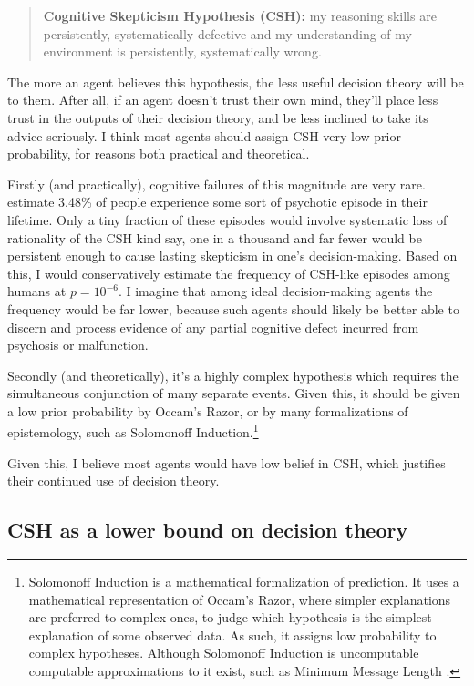\documentclass{article}
\begin{document}
\begin{quote}
\textbf{Cognitive Skepticism Hypothesis (CSH):} my reasoning skills are persistently, systematically defective and my understanding of my environment is persistently, systematically wrong.
\end{quote}

\noindent
The more an agent believes this hypothesis, the less useful decision theory will be to them. After all, if an agent doesn't trust their own mind, they'll place less trust in the outputs of their decision theory, and be less inclined to take its advice seriously. I think most agents should assign CSH very low prior probability, for reasons both practical and theoretical.

Firstly (and practically), cognitive failures of this magnitude are very rare. \citet{perala2007lifetime} estimate 3.48\% of people experience some sort of psychotic episode in their lifetime. Only a tiny fraction of these episodes would involve systematic loss of rationality of the CSH kind \textemdash{} say, one in a thousand \textemdash{} and far fewer would be persistent enough to cause lasting skepticism in one's decision-making. Based on this, I would conservatively estimate the frequency of CSH-like episodes among humans at \(p = 10^{-6}\). I imagine that among ideal decision-making agents the frequency would be far lower, because such agents should likely be better able to discern and process evidence of any partial cognitive defect incurred from psychosis or malfunction. 

Secondly (and theoretically), it's a highly complex hypothesis which requires the simultaneous conjunction of many separate events. Given this, it should be given a low prior probability by Occam's Razor, or by many formalizations of epistemology, such as Solomonoff Induction.\footnote{Solomonoff Induction \citep{solomonoff1964formal} is a mathematical formalization of prediction. It uses a mathematical representation of Occam's Razor, where simpler explanations are preferred to complex ones, to judge which hypothesis is the simplest explanation of some observed data. As such, it assigns low probability to complex hypotheses. Although Solomonoff Induction is uncomputable computable approximations to it exist, such as Minimum Message Length \citep{wallace1999minimum}.}

Given this, I believe most agents would have low belief in CSH, which justifies their continued use of decision theory.

\subsection{CSH as a lower bound on decision theory}
\end{document}
